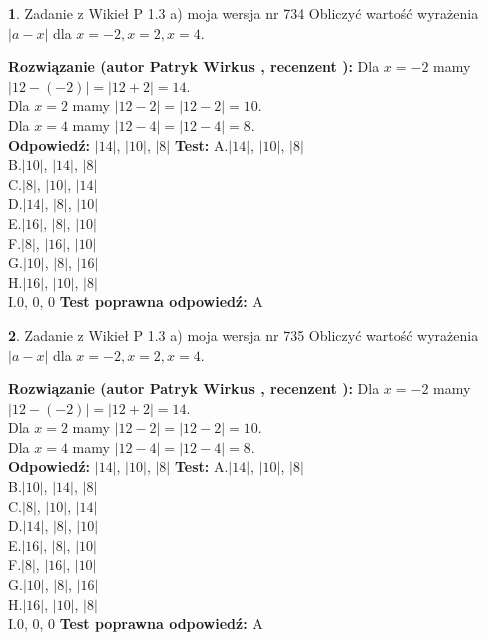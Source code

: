 \documentclass[12pt, a4paper]{article}
\theoremstyle{definition} %
\newtheorem{zad}{}
\newcommand{\zadStart}[1]{\begin{zad}#1\newline}
\newcommand{\zadStop}{\end{zad}}
\newcommand{\rozwStart}[2]{\noindent \textbf{Rozwiązanie (autor #1 , recenzent #2): }\newline}
\newcommand{\rozwStop}{\newline}
\newcommand{\odpStart}{\noindent \textbf{Odpowiedź:}\newline}
\newcommand{\odpStop}{\newline}
\newcommand{\testStart}{\noindent \textbf{Test:}\newline}
\newcommand{\testStop}{\newline}
\newcommand{\kluczStart}{\noindent \textbf{Test poprawna odpowiedź:}\newline}
\newcommand{\kluczStop}{\newline}
\begin{document}
\zadStart{Zadanie z Wikieł P 1.3 a) moja wersja nr 734}
Obliczyć wartość wyrażenia $|a - x|$ dla $x=-2,x=2,x=4$.
\zadStop
\rozwStart{Patryk Wirkus}{}
Dla $x = -2$ mamy $|12 - (-2)| = |12 + 2| = 14$.\\
Dla $x = 2$ mamy $|12 - 2| = |12 - 2| = 10$.\\
Dla $x = 4$ mamy $|12 - 4| = |12 - 4| = 8$.\\
\rozwStop
\odpStart
$|14|$, $|10|$, $|8|$
\odpStop
\testStart
A.$|14|$, $|10|$, $|8|$\\
B.$|10|$, $|14|$, $|8|$\\
C.$|8|$, $|10|$, $|14|$\\
D.$|14|$, $|8|$, $|10|$\\
E.$|16|$, $|8|$, $|10|$\\
F.$|8|$, $|16|$, $|10|$\\
G.$|10|$, $|8|$, $|16|$\\
H.$|16|$, $|10|$, $|8|$\\
I.$0$, $0$, $0$
\testStop
\kluczStart
A
\kluczStop



\zadStart{Zadanie z Wikieł P 1.3 a) moja wersja nr 735}
Obliczyć wartość wyrażenia $|a - x|$ dla $x=-2,x=2,x=4$.
\zadStop
\rozwStart{Patryk Wirkus}{}
Dla $x = -2$ mamy $|12 - (-2)| = |12 + 2| = 14$.\\
Dla $x = 2$ mamy $|12 - 2| = |12 - 2| = 10$.\\
Dla $x = 4$ mamy $|12 - 4| = |12 - 4| = 8$.\\
\rozwStop
\odpStart
$|14|$, $|10|$, $|8|$
\odpStop
\testStart
A.$|14|$, $|10|$, $|8|$\\
B.$|10|$, $|14|$, $|8|$\\
C.$|8|$, $|10|$, $|14|$\\
D.$|14|$, $|8|$, $|10|$\\
E.$|16|$, $|8|$, $|10|$\\
F.$|8|$, $|16|$, $|10|$\\
G.$|10|$, $|8|$, $|16|$\\
H.$|16|$, $|10|$, $|8|$\\
I.$0$, $0$, $0$
\testStop
\kluczStart
A
\kluczStop
\end{document}
